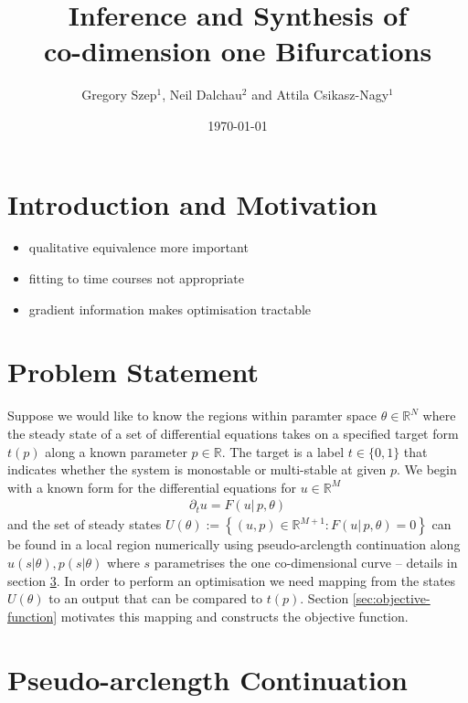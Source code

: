 \documentclass{article}[12pt]
\numberwithin{equation}{section}
\begin{document}
\title{
	Inference and Synthesis of\\
	co-dimension one Bifurcations
}

\author{Gregory Szep$^1$, Neil Dalchau$^2$ and Attila Csikasz-Nagy$^1$}
\date{\today}
\maketitle
\vspace{-25pt}
\section{Introduction and Motivation}

\begin{itemize}
\item qualitative equivalence more important
\item fitting to time courses not appropriate
\item gradient information makes optimisation tractable
\end{itemize}

\section{Problem Statement}

Suppose we would like to know the regions within paramter space
$\theta\in\mathbb{R}^N$
where the steady state of a set of differential equations
takes on a specified target form $t(p)$ along a known parameter
$p\in\mathbb{R}$. The target is a label $t\in\{0,1\}$ that indicates
whether the system is monostable or multi-stable at given $p$. We begin with a known form
for the differential equations for $u\in\mathbb{R}^M$
\begin{align}
	\partial_t u=F(u|\,p,\theta) 
\end{align}
and the set of steady states
$U(\theta) := \left\{ (u,p)\in\mathbb{R}^{M+1} : F(u|\,p,\theta)=0\right\}$
can be found in a local region numerically using
pseudo-arclength continuation along $u(s|\theta),p(s|\theta)$ \cite{} where
$s$ parametrises the one co-dimensional curve -- details in section
\ref{sec:continuation}.
In order to perform an optimisation 
we need mapping from the states $U(\theta)$ to an output that can be
compared to $t(p)$. Section \ref{sec:objective-function} motivates this mapping and
constructs the objective function.

\section{Pseudo-arclength Continuation}
\label{sec:continuation}
\end{document}
